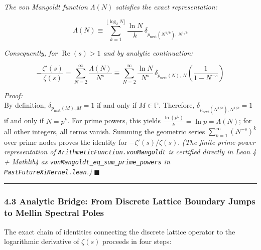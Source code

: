 \documentclass[
  11pt,
]{article}
\begin{document}
\emph{The von Mangoldt function \(\Lambda(N)\) satisfies the exact
representation:}

\[\Lambda(N) \equiv \sum_{k=1}^{\lfloor\log_2 N\rfloor} \frac{\ln N}{k} \, \delta_{p_{\text{next}}(N^{1/k}), \, N^{1/k}}\]

\emph{Consequently, for \(\operatorname{Re}(s) > 1\) and by analytic
continuation:}

\[-\frac{\zeta'(s)}{\zeta(s)} = \sum_{N=2}^\infty \frac{\Lambda(N)}{N^s} \equiv \sum_{N=2}^\infty \frac{\ln N}{N^s} \, \delta_{p_{\text{next}}(N), \, N} \left(\frac{1}{1 - N^{-s}}\right)\]

\emph{Proof:}\\
By definition, \(\delta_{p_{\text{next}}(M), M} = 1\) if and only if
\(M \in \mathbb{P}\). Therefore,
\(\delta_{p_{\text{next}}(N^{1/k}), N^{1/k}} = 1\) if and only if
\(N = p^k\). For prime powers, this yields
\(\frac{\ln(p^k)}{k} = \ln p = \Lambda(N)\); for all other integers, all
terms vanish. Summing the geometric series
\(\sum_{k=1}^\infty (N^{-s})^k\) over prime nodes proves the identity
for \(-\zeta'(s)/\zeta(s)\). \emph{(The finite prime-power
representation of \texttt{ArithmeticFunction.vonMangoldt} is certified
directly in Lean 4 + Mathlib4 as
\texttt{vonMangoldt\_eq\_sum\_prime\_powers} in
\texttt{PastFutureXiKernel.lean}.)} \(\blacksquare\)

\begin{center}\rule{0.5\linewidth}{0.5pt}\end{center}

\subsubsection{4.3 Analytic Bridge: From Discrete Lattice Boundary Jumps
to Mellin Spectral
Poles}\label{analytic-bridge-from-discrete-lattice-boundary-jumps-to-mellin-spectral-poles}

The exact chain of identities connecting the discrete lattice operator
to the logarithmic derivative of \(\zeta(s)\) proceeds in four steps:
\end{document}
